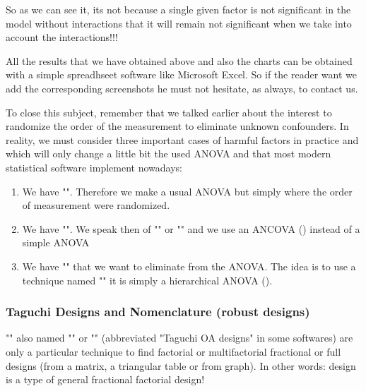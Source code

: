 	So as we can see it, its not because a single given factor is not significant in the model without interactions that it will remain not significant when we take into account the interactions!!!\\
	\begin{tcolorbox}[title=Remark,colframe=black,arc=10pt]
	All the results that we have obtained above and also the charts can be obtained with a simple spreadhseet software like Microsoft Excel. So if the reader want we add the corresponding screenshots he must not hesitate, as always, to contact us.
	\end{tcolorbox}
	To close this subject, remember that we talked earlier about the interest to randomize the order of the measurement to eliminate unknown confounders. In reality, we must consider three important cases of harmful factors in practice and which will only change a little bit the used ANOVA and that most modern statistical software implement nowadays:
	\begin{enumerate}
		\item We have "". Therefore we make a usual ANOVA but simply where the order of measurement were randomized.

		\item We have "". We speak then of "" or "" and we use an ANCOVA () instead of a simple ANOVA

		\item We have "" that we want to eliminate from the ANOVA. The idea is to use a technique named "" it is simply a hierarchical ANOVA ().
	\end{enumerate}
	
	\pagebreak
	\subsubsection{Taguchi Designs and Nomenclature (robust designs)}
	"" also named "" or "" (abbreviated "Taguchi OA designs" in some softwares) are only a particular technique to find factorial or multifactorial fractional or full designs (from a matrix, a triangular table or from graph). In other words: design is a type of general fractional factorial design!
	
